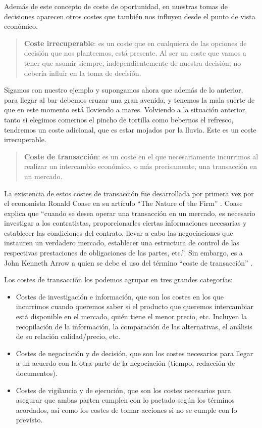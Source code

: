 \documentclass[
]{krantz}
\providecommand{\tightlist}{%
  \setlength{\itemsep}{0pt}\setlength{\parskip}{0pt}}
\begin{document}
Además de este concepto de coste de oportunidad, en nuestras tomas de decisiones aparecen otros costes que también nos influyen desde el punto de vista económico.

\begin{quote}
\textbf{Coste irrecuperable}: es un coste que en cualquiera de las opciones de decisión que nos planteemos, está presente. Al ser un coste que vamos a tener que asumir siempre, independientemente de nuestra decisión, no debería influir en la toma de decisión.
\end{quote}

Sigamos con nuestro ejemplo y supongamos ahora que además de lo anterior, para llegar al bar debemos cruzar una gran avenida, y tenemos la mala suerte de que en este momento está lloviendo a mares. Volviendo a la situación anterior, tanto si elegimos comernos el pincho de tortilla como bebernos el refresco, tendremos un coste adicional, que es estar mojados por la lluvia. Este es un coste irrecuperable.

\begin{quote}
\textbf{Coste de transacción}: es un coste en el que necesariamente incurrimos al realizar un intercambio económico, o más precisamente, una transacción en un mercado.
\end{quote}

La existencia de estos costes de transacción fue desarrollada por primera vez por el economista Ronald Coase en su artículo ``The Nature of the Firm'' \citep{coase1937}. Coase explica que ``cuando se desea operar una transacción en un mercado, es necesario investigar a los contratistas, proporcionarles ciertas informaciones necesarias y establecer las condiciones del contrato, llevar a cabo las negociaciones que instauren un verdadero mercado, establecer una estructura de control de las respectivas prestaciones de obligaciones de las partes, etc.''. Sin embargo, es a John Kenneth Arrow a quien se debe el uso del término ``coste de transacción'' \citep{arrow1969}.

Los costes de transacción los podemos agrupar en tres grandes categorías:

\begin{itemize}
\tightlist
\item
  Costes de investigación e información, que son los costes en los que incurrimos cuando queremos saber si el producto que queremos intercambiar está disponible en el mercado, quién tiene el menor precio, etc. Incluyen la recopilación de la información, la comparación de las alternativas, el análisis de su relación calidad/precio, etc.
\item
  Costes de negociación y de decisión, que son los costes necesarios para llegar a un acuerdo con la otra parte de la negociación (tiempo, redacción de documentos).
\item
  Costes de vigilancia y de ejecución, que son los costes necesarios para asegurar que ambas parten cumplen con lo pactado según los términos acordados, así como los costes de tomar acciones si no se cumple con lo previsto.
\end{itemize}
\end{document}
